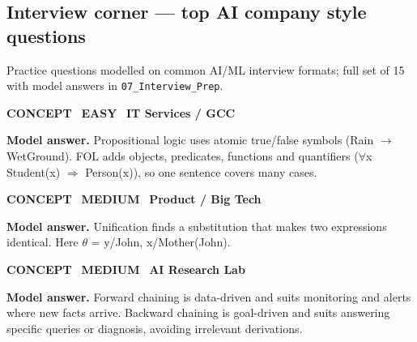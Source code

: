 \subsection*{Interview corner --- top AI company style questions}
{\small\color{slate}Practice questions modelled on common AI/ML interview formats; full set of 15 with model answers in \texttt{07\_Interview\_Prep}.}
\begin{tcolorbox}[enhanced,breakable,colback=white,colframe=teal,arc=2mm,boxrule=0.8pt,left=3mm,right=3mm,
 title={\textbf{QIII.01}\quad Differentiate propositional logic and first-order logic with an example.},fonttitle=\color{white}\small,colbacktitle=teal]
\colorbox{teal!15}{\scriptsize\bfseries\color{teal} CONCEPT}\
\colorbox{leaf!15}{\scriptsize\bfseries\color{leaf} EASY}\
\colorbox{navy!8}{\scriptsize\bfseries\color{navy} IT Services / GCC}\par\smallskip
\textbf{\color{navy}Model answer.} Propositional logic uses atomic true/false symbols (Rain $\to$ WetGround). FOL adds objects, predicates, functions and quantifiers ($\forall$x Student(x) $\Rightarrow$ Person(x)), so one sentence covers many cases.
\end{tcolorbox}
\begin{tcolorbox}[enhanced,breakable,colback=white,colframe=teal,arc=2mm,boxrule=0.8pt,left=3mm,right=3mm,
 title={\textbf{QIII.02}\quad What is unification? Unify Knows(John, x) with Knows(y, Mother(y)).},fonttitle=\color{white}\small,colbacktitle=teal]
\colorbox{teal!15}{\scriptsize\bfseries\color{teal} CONCEPT}\
\colorbox{gold!85!black!15}{\scriptsize\bfseries\color{gold!85!black} MEDIUM}\
\colorbox{navy!8}{\scriptsize\bfseries\color{navy} Product / Big Tech}\par\smallskip
\textbf{\color{navy}Model answer.} Unification finds a substitution that makes two expressions identical. Here $\theta$ = {y/John, x/Mother(John)}.
\end{tcolorbox}
\begin{tcolorbox}[enhanced,breakable,colback=white,colframe=teal,arc=2mm,boxrule=0.8pt,left=3mm,right=3mm,
 title={\textbf{QIII.03}\quad Forward vs backward chaining --- when do you prefer each?},fonttitle=\color{white}\small,colbacktitle=teal]
\colorbox{teal!15}{\scriptsize\bfseries\color{teal} CONCEPT}\
\colorbox{gold!85!black!15}{\scriptsize\bfseries\color{gold!85!black} MEDIUM}\
\colorbox{navy!8}{\scriptsize\bfseries\color{navy} AI Research Lab}\par\smallskip
\textbf{\color{navy}Model answer.} Forward chaining is data-driven and suits monitoring and alerts where new facts arrive. Backward chaining is goal-driven and suits answering specific queries or diagnosis, avoiding irrelevant derivations.
\end{tcolorbox}
